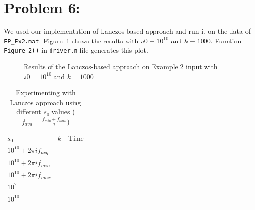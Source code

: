 \section*{Problem 6:}
We used our implementation of Lanczos-based approach and run it on the data of \texttt{FP\_Ex2.mat}. Figure~\ref{fig:fig2} shows the results with $s0 = 10^{10}$ and $k = 1000$.  Function \texttt{Figure\_2()} in \texttt{driver.m} file generates this plot. 

\begin{figure}[!tbh]
\centering        
   \caption{Results of the Lanczos-based approach on Example 2 input with $s0 = 10^{10}$ and $k = 1000$ }
   \label{fig:fig2}
\end{figure}




\begin{table}[!tbh]
 \centering    
\begin{tabular}{ |p{3.0cm}|p{1.5cm}| p{4cm}||}
\hline
 $s_{0}$  & $k$ & Time           \\ \hhline{|=|=|=|}   
 $10^{10} + 2 \pi i f_{avg}$ & &  \\
 $10^{10} + 2 \pi i f_{min}$ & &  \\
 $10^{10} + 2 \pi i f_{max}$ & &  \\
 $10^{?} $                   & &  \\
 $10^{10}$                   & &  \\  
\hline
\end{tabular} 
\caption{Experimenting with Lanczos approach using different $s_{0}$ values ($f_{avg} = \frac{f_{min}+f_{max}}{2}$) }
   \label{tab:s02}
\end{table}